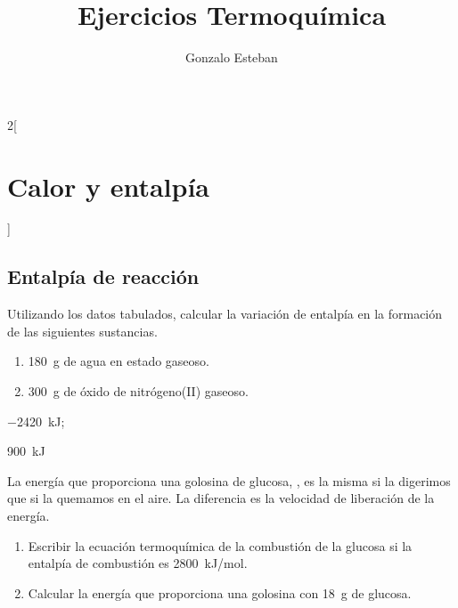 \documentclass[10pt]{article}
\title{Ejercicios Termoquímica}
\author{Gonzalo Esteban}
\begin{document}
\maketitle

\begin{multicols}{2}[
    \section{Calor y entalpía}
  ]

  \subsection{Entalpía de reacción}

  \begin{exercise}[
      tags    = {termodinámica, entalpía, entalpia de reacción, calor},
      topics  = {química, termoquímica, termodinámica},
      source  = {},
    ]
    Utilizando los datos tabulados, calcular la variación de entalpía en la formación de las siguientes sustancias.
    \begin{enumerate}
      \item \SI{180}{\gram} de agua en estado gaseoso.
      \item \SI{300}{\gram} de óxido de nitrógeno(II) gaseoso.
    \end{enumerate}
  \end{exercise}

  \begin{solution}
    \begin{enumerate*}
      \item \SI{-2420}{\kilo\joule}; \item \SI{900}{\kilo\joule}
    \end{enumerate*}
  \end{solution}




  \begin{exercise}[
      tags    = {termodinámica, entalpía, entalpia de reacción, calor},
      topics  = {química, termoquímica, termodinámica},
      source  = {},
    ]
    La energía que proporciona una golosina de glucosa, , es la misma si la digerimos que si la quemamos en el aire. La diferencia es la velocidad de liberación de la energía.
    \begin{enumerate}
      \item Escribir la ecuación termoquímica de la combustión de la glucosa si la entalpía de combustión es \SI{2800}{kJ/mol}.
      \item Calcular la energía que proporciona una golosina con \SI{18}{\gram} de glucosa.
    \end{enumerate}
  \end{exercise}


\end{multicols}
\end{document}
